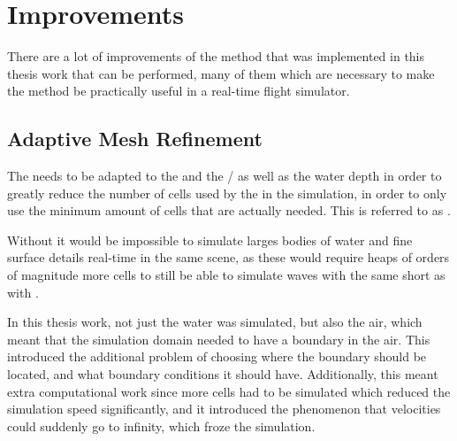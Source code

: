 \section{Improvements}
\label{chap:improvements}

There are a lot of improvements of the method that was implemented in this thesis work that can be performed, many of them which are necessary to make the method be practically useful in a real-time flight simulator.



\subsection{Adaptive Mesh Refinement}

The \LOD needs to be adapted to the  and the \FOV/ as well as the water depth in order to greatly reduce the number of cells used by the \FVM in the simulation, in order to only use the minimum amount of cells that are actually needed. This is referred to as \AMR.

Without \AMR it would be impossible to simulate larges bodies of water and fine surface details real-time in the same scene, as these would require heaps of orders of magnitude more cells to still be able to simulate waves with the same short \wavelength as with \AMR.


In this thesis work, not just the water was simulated, but also the air, which meant that the simulation domain needed to have a boundary in the air. This introduced the additional problem of choosing where the boundary should be located, and what boundary conditions it should have. Additionally, this meant extra computational work since more cells had to be simulated which reduced the simulation speed significantly, and it introduced the phenomenon that velocities could suddenly go to infinity, which froze the simulation.


